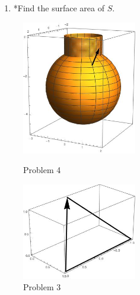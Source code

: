 \documentclass[12pt]{article}
\begin{document}
\begin{enumerate}
\begin{enumerate}
\item *Find the surface area of $S$.
\end{enumerate}



 \begin{figure}[h]
 \begin{center}


 \end{center}
 \end{figure}
 
\begin{figure}
\centering
\parbox{5cm}{
 \includegraphics[width=5cm]{grenade.jpeg}
 \caption{Problem 4}
 \label{fig1}}
\qquad
\begin{minipage}{5cm}
\includegraphics[width=5cm]{path.jpeg}
\caption{Problem 3}
\label{fig2}
\end{minipage}
\end{figure} 
 




\end{enumerate}
\end{document}
